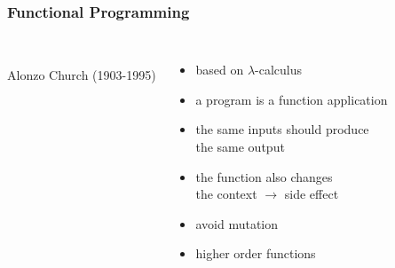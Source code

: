 \documentclass[dvipsnames]{beamer}
\theoremstyle{plain}
\begin{document}
\begin{frame}
  \frametitle{Functional Programming}

  \begin{columns}
    \begin{center}
      \\
      Alonzo Church (1903-1995)
    \end{center}

    \begin{itemize}
      \item based on $\lambda$-calculus
      \item a program is a function application
      \item the same inputs should produce\\
        the same output

      \pause
      \medskip
      \item the function also changes\\
        the context $\rightarrow$ \alert{side effect}
      \item avoid mutation

      \pause
      \medskip
      \item higher order functions
    \end{itemize}
  \end{columns}
\end{frame}
\end{document}
